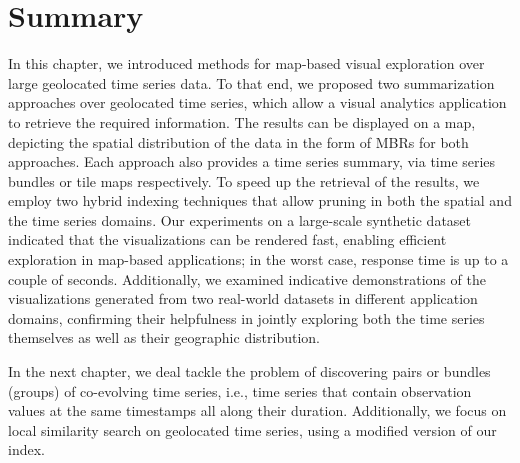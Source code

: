 
\graphicspath{{Papers/ElsevierBigDataResearch/}}

\section{Summary}
\label{sec:concl_vis}

In this chapter, we introduced methods for map-based visual exploration over large geolocated time series data. To that end, we proposed two summarization approaches over geolocated time series, which allow a visual analytics application to retrieve the required information. The results can be displayed on a map, depicting the spatial distribution of the data in the form of MBRs for both approaches. Each approach also provides a time series summary, via time series bundles or tile maps respectively. To speed up the retrieval of the results, we employ two hybrid indexing techniques that allow pruning in both the spatial and the time series domains. Our experiments on a large-scale synthetic dataset indicated that the visualizations can be rendered fast, enabling efficient exploration in map-based applications; in the worst case, response time is up to a couple of seconds. Additionally, we examined indicative demonstrations of the visualizations generated from two real-world datasets in different application domains, confirming their helpfulness in jointly exploring both the time series themselves as well as their geographic distribution.

In the next chapter, we deal tackle the problem of discovering pairs or bundles (groups) of co-evolving time series, i.e., time series that contain observation values at the same timestamps all along their duration. Additionally, we focus on local similarity search on geolocated time series, using a modified version of our \btsr index.